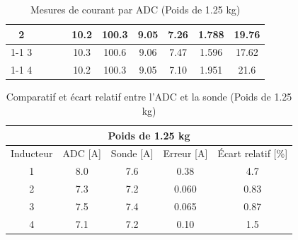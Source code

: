 \begin{table}[H]
{\begin{tabular}{|c|c|c|c|c|c|c|c|c|c|}
            2         &                                                            &                           &                                                         & 10.2                                                     & 100.3                                                   & 9.05                                                                & 7.26                                                  & 1.788  & 19.76                                                             \\ \cline{1-1} \cline{5-10}
            3         &                                                            &                           &                                                         & 10.3                                                     & 100.6                                                   & 9.06                                                                & 7.47                                                  & 1.596  & 17.62                                                             \\ \cline{1-1} \cline{5-10}
            4         &                                                            &                           &                                                         & 10.2                                                     & 100.3                                                   & 9.05                                                                & 7.10                                                  & 1.951  & 21.6                                                              \\ \hline
        \end{tabular}%
    }
    \caption{Mesures de courant par ADC (Poids de 1.25 kg)}
    \label{tab:poids_1_25_adc}
\end{table}

\begin{table}[H]
    \centering
    \begin{tabular}{|c|c|c|c|c|}
        \hline
        \multicolumn{5}{|c|}{\textbf{Poids de 1.25 kg}}                                   \\ \hline
        Inducteur & ADC {[}A{]} & Sonde {[}A{]} & Erreur {[}A{]} & Écart relatif {[}\%{]} \\ \hline
        1         & 8.0         & 7.6           & 0.38           & 4.7                    \\ \hline
        2         & 7.3         & 7.2           & 0.060          & 0.83                   \\ \hline
        3         & 7.5         & 7.4           & 0.065          & 0.87                   \\ \hline
        4         & 7.1         & 7.2           & 0.10           & 1.5                    \\ \hline
    \end{tabular}
    \caption{Comparatif et écart relatif entre l'ADC et la sonde (Poids de 1.25 kg)}
    \label{tab:poids_1_25_comp}
\end{table}

